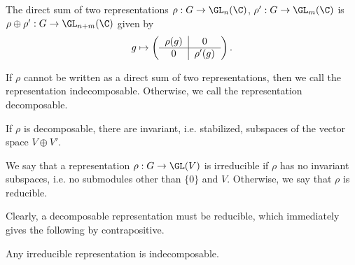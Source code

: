 The direct sum of two representations $\rho: G \to \GL_n(\C)$, $\rho': G \to \GL_m(\C)$ is $\rho \oplus \rho' : G \to \GL_{n+m}(\C)$ given by 
	\[
	g \mapsto \left(\begin{tabular}{c|c} $\rho(g)$ & 0 \\ \hline 0 & $\rho'(g)$ \end{tabular}\right).
	\]


\begin{dfn}[Indecomposable]
If $\rho$ cannot be written as a direct sum of two representations, then we call the representation indecomposable. Otherwise, we call the representation decomposable. 
\end{dfn}


If $\rho$ is decomposable, there are invariant, i.e. stabilized, subspaces of the vector space $V \oplus V'$. 


\begin{dfn}[Irreducible]
We say that a representation $\rho: G \to \GL(V)$ is irreducible if $\rho$ has no invariant subspaces, i.e. no submodules other than $\{0\}$ and $V$. Otherwise, we say that $\rho$ is reducible.
\end{dfn}


Clearly, a decomposable representation must be reducible, which immediately gives the following by contrapositive. 

\begin{thm}
Any irreducible representation is indecomposable. 
\end{thm}


